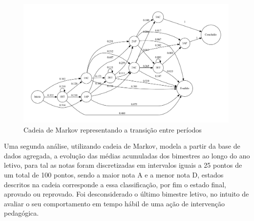 \documentclass{article}
\begin{document}
\begin{figure}[H]
\centering
\includegraphics[width=0.99\textwidth]{cadeia.pdf}
\caption{Cadeia de Markov representando a transição entre períodos}
\label{markovPeriodos}
\end{figure}

Uma segunda análise, utilizando cadeia de Markov, modela a partir da base de dados agregada, a evolução das médias acumuladas dos bimestres ao longo do ano letivo, para tal as notas foram discretizadas em intervalos iguais a 25 pontos de um total de 100 pontos, sendo a maior nota A e a menor nota D, estados descritos na cadeia corresponde a essa classificação, por fim o estado final, aprovado ou reprovado.  Foi desconsiderado o último bimestre letivo, no intuito de avaliar o seu comportamento em tempo hábil de uma ação de intervenção pedagógica.
\end{document}
